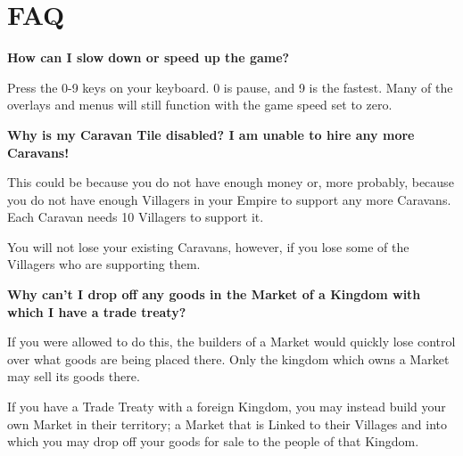 
\chapter{\textsf{FAQ}}


{\large \textbf{\textsf{How can I slow down or speed up the game?}}}


Press the 0-9 keys on your keyboard. 0 is pause, and 9 is the fastest. Many of the overlays and menus will still function with the game speed set to zero.

{\large \textbf{\textsf{Why is my Caravan Tile disabled? I am unable to hire any more Caravans!}}}

This could be because you do not have enough money or, more probably, because you do not have enough Villagers in your Empire to support any more Caravans. Each Caravan needs 10 Villagers to support it.

You will not lose your existing Caravans, however, if you lose some of the Villagers who are supporting them.

{\large \textbf{\textsf{Why can’t I drop off any goods in the Market of a Kingdom with which I have a trade treaty?}}}

If you were allowed to do this, the builders of a Market would quickly lose control over what goods are being placed there. Only the kingdom which owns a Market may sell its goods there.


If you have a Trade Treaty with a foreign Kingdom, you may instead build your own Market in their territory; a Market that is Linked to their Villages and into which you may drop off your goods for sale to the people of that Kingdom.

